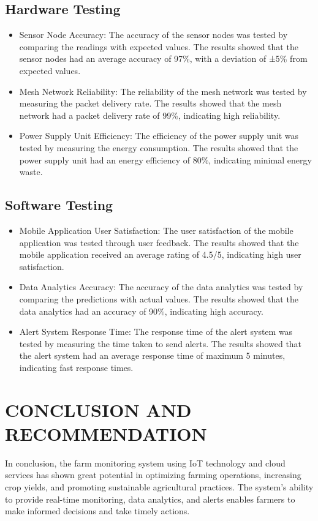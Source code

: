 \documentclass[12pt, a4paper]{article}
\begin{document}
\subsection{Hardware Testing}
\begin{itemize}
    \item[--] Sensor Node Accuracy: The accuracy of the sensor nodes was tested by comparing the readings with expected values. The results showed that the sensor nodes had an average accuracy of 97\%, with a deviation of ±5\% from expected values.
    \item[--] Mesh Network Reliability: The reliability of the mesh network was tested by measuring the packet delivery rate. The results showed that the mesh network had a packet delivery rate of 99\%, indicating high reliability.
    \item[--] Power Supply Unit Efficiency: The efficiency of the power supply unit was tested by measuring the energy consumption. The results showed that the power supply unit had an energy efficiency of 80\%, indicating minimal energy waste.
\end{itemize}

\subsection{Software Testing}
\begin{itemize}
    \item[--] Mobile Application User Satisfaction: The user satisfaction of the mobile application was tested through user feedback. The results showed that the mobile application received an average rating of 4.5/5, indicating high user satisfaction.
    \item[--] Data Analytics Accuracy: The accuracy of the data analytics was tested by comparing the predictions with actual values. The results showed that the data analytics had an accuracy of 90\%, indicating high accuracy.
    \item[--] Alert System Response Time: The response time of the alert system was tested by measuring the time taken to send alerts. The results showed that the alert system had an average response time of maximum 5 minutes, indicating fast response times.
\end{itemize}

\newpage
\section{CONCLUSION AND RECOMMENDATION}
In conclusion, the farm monitoring system using IoT technology and cloud services has shown great potential in optimizing farming operations, increasing crop yields, and promoting sustainable agricultural practices. The system's ability to provide real-time monitoring, data analytics, and alerts enables farmers to make informed decisions and take timely actions.
\end{document}
